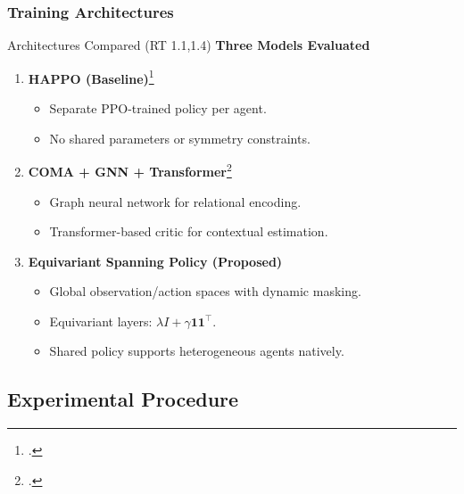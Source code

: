 
\subsubsection{Training Architectures}

\begin{frame}{Architectures Compared (RT 1.1,1.4)}
    \textbf{Three Models Evaluated}
    \begin{enumerate}
        \item \textbf{HAPPO (Baseline)}\footcite{zhong2024}
            \begin{itemize}
                \item Separate PPO-trained policy per agent.
                \item No shared parameters or symmetry constraints.
            \end{itemize}
        \item \textbf{COMA + GNN + Transformer}\footcite{liu2020b}
            \begin{itemize}
                \item Graph neural network for relational encoding.
                \item Transformer-based critic for contextual estimation.
            \end{itemize}
        \item \textbf{Equivariant Spanning Policy (Proposed)}
            \begin{itemize}
                \item Global observation/action spaces with dynamic masking.
                \item Equivariant layers: \(\lambda I + \gamma \mathbf{11}^\top\).
                \item Shared policy supports heterogeneous agents natively.
            \end{itemize}
    \end{enumerate}
\end{frame}



\subsection{Experimental Procedure}

